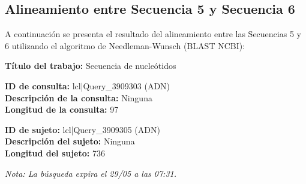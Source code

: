 \documentclass[fleqn,10pt]{article}
\begin{document}
\subsection*{Alineamiento entre Secuencia 5 y Secuencia 6}

A continuación se presenta el resultado del alineamiento entre las Secuencias 5 y 6 utilizando el algoritmo de Needleman-Wunsch (BLAST NCBI):

\begin{tcolorbox}[breakable, colback=gray!5!white, colframe=gray!75!black, title=Resultado de alineamiento (BLAST NCBI)]
\textbf{Título del trabajo:} Secuencia de nucleótidos

\textbf{ID de consulta:} lcl|Query\_3909303 (ADN)\\
\textbf{Descripción de la consulta:} Ninguna\\
\textbf{Longitud de la consulta:} 97

\textbf{ID de sujeto:} lcl|Query\_3909305 (ADN)\\
\textbf{Descripción del sujeto:} Ninguna\\
\textbf{Longitud del sujeto:} 736

\textit{Nota: La búsqueda expira el 29/05 a las 07:31.}
\end{tcolorbox}
\end{document}
